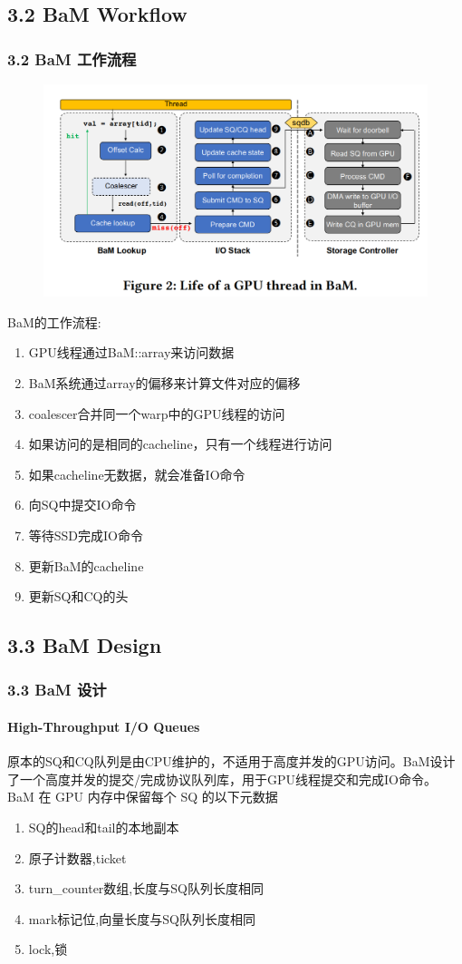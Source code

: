 \documentclass[10pt]{ctexbeamer}
\begin{document}
\subsection{3.2 BaM Workflow}\label{sec:3-2}
\begin{frame}[t]
  \frametitle{3.2 BaM 工作流程}
    \begin{figure}
      \includegraphics[width=.5\textwidth, height=.5\textheight, keepaspectratio]{images/bam-workflow.png}
    \end{figure}
    \begin{minipage}{0.5\textwidth}
      BaM的工作流程:
      \begin{enumerate}
        \item GPU线程通过BaM::array来访问数据
        \item BaM系统通过array的偏移来计算文件对应的偏移
        \item coalescer合并同一个warp中的GPU线程的访问
        \item 如果访问的是相同的cacheline，只有一个线程进行访问
        \item 如果cacheline无数据，就会准备IO命令
        \item 向SQ中提交IO命令
        \item 等待SSD完成IO命令
        \item 更新BaM的cacheline
        \item 更新SQ和CQ的头
      \end{enumerate}      
    \end{minipage}
\end{frame}

\subsection{3.3 BaM Design}\label{sec:3-3}
\begin{frame}[t]
  \frametitle{3.3 BaM 设计}
  \framesubtitle{High-Throughput I/O Queues}
  原本的SQ和CQ队列是由CPU维护的，不适用于高度并发的GPU访问。BaM设计了一个高度并发的提交/完成协议队列库，用于GPU线程提交和完成IO命令。
  BaM 在 GPU 内存中保留每个 SQ 的以下元数据
  \begin{enumerate}
    \item SQ的head和tail的本地副本
    \item 原子计数器,ticket
    \item turn\_counter数组,长度与SQ队列长度相同
    \item mark标记位,向量长度与SQ队列长度相同
    \item lock,锁
  \end{enumerate}

\end{frame}
\end{document}
